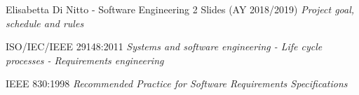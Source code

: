 \begin{thebibliography}{9}

  	Elisabetta Di Nitto - Software Engineering 2 Slides (AY 2018/2019) \emph{Project goal, schedule and rules}

	ISO/IEC/IEEE 29148:2011 \emph{Systems and software engineering - Life cycle processes - Requirements engineering}

	IEEE 830:1998 \emph{Recommended Practice for Software Requirements Specifications}
  
\end{thebibliography}
